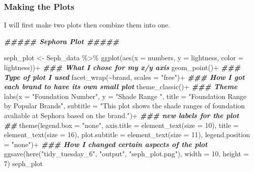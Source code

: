 \documentclass[
]{article}
\newenvironment{Shaded}{\begin{snugshade}}{\end{snugshade}}
\newcommand{\AttributeTok}[1]{\textcolor[rgb]{0.77,0.63,0.00}{#1}}
\newcommand{\DecValTok}[1]{\textcolor[rgb]{0.00,0.00,0.81}{#1}}
\newcommand{\DocumentationTok}[1]{\textcolor[rgb]{0.56,0.35,0.01}{\textbf{\textit{#1}}}}
\newcommand{\FunctionTok}[1]{\textcolor[rgb]{0.00,0.00,0.00}{#1}}
\newcommand{\NormalTok}[1]{#1}
\newcommand{\OtherTok}[1]{\textcolor[rgb]{0.56,0.35,0.01}{#1}}
\newcommand{\SpecialCharTok}[1]{\textcolor[rgb]{0.00,0.00,0.00}{#1}}
\newcommand{\StringTok}[1]{\textcolor[rgb]{0.31,0.60,0.02}{#1}}
\begin{document}
\hypertarget{making-the-plots}{%
\subsubsection{Making the Plots}\label{making-the-plots}}

I will first make two plots then combine them into one.

\begin{Shaded}
\begin{Highlighting}[]
\DocumentationTok{\#\#\#\#\# Sephora Plot \#\#\#\#\#}

\NormalTok{seph\_plot }\OtherTok{\textless{}{-}}\NormalTok{ Seph\_data }\SpecialCharTok{\%\textgreater{}\%}
  \FunctionTok{ggplot}\NormalTok{(}\FunctionTok{aes}\NormalTok{(}\AttributeTok{x =}\NormalTok{ numbers,             }
             \AttributeTok{y =}\NormalTok{ lightness,}
             \AttributeTok{color =}\NormalTok{ lightness))}\SpecialCharTok{+}               \DocumentationTok{\#\#\# What I chose for my x/y axis}
  \FunctionTok{geom\_point}\NormalTok{()}\SpecialCharTok{+}                                 \DocumentationTok{\#\#\# Type of plot I used}
  \FunctionTok{facet\_wrap}\NormalTok{(}\SpecialCharTok{\textasciitilde{}}\NormalTok{brand, }\AttributeTok{scales =} \StringTok{"free"}\NormalTok{)}\SpecialCharTok{+}          \DocumentationTok{\#\#\# How I got each brand to have its own small plot}
  \FunctionTok{theme\_classic}\NormalTok{()}\SpecialCharTok{+}                              \DocumentationTok{\#\#\# Theme }
  \FunctionTok{labs}\NormalTok{(}\AttributeTok{x =} \StringTok{"Foundation Number"}\NormalTok{,}
       \AttributeTok{y =} \StringTok{"Shade Range "}\NormalTok{,}
       \AttributeTok{title =} \StringTok{"Foundation Range by Popular Brands"}\NormalTok{,}
       \AttributeTok{subtitle =} \StringTok{"This plot shows the shade ranges }
\StringTok{of foundation avaliable at Sephora based on the brand."}\NormalTok{)}\SpecialCharTok{+} \DocumentationTok{\#\#\# new labels for the plot \#\#}
  \FunctionTok{theme}\NormalTok{(}\AttributeTok{legend.box =} \StringTok{"none"}\NormalTok{,}
        \AttributeTok{axis.title =} \FunctionTok{element\_text}\NormalTok{(}\AttributeTok{size =} \DecValTok{10}\NormalTok{),}
        \AttributeTok{title =} \FunctionTok{element\_text}\NormalTok{(}\AttributeTok{size =} \DecValTok{16}\NormalTok{),}
        \AttributeTok{plot.subtitle =} \FunctionTok{element\_text}\NormalTok{(}\AttributeTok{size =} \DecValTok{11}\NormalTok{),}
        \AttributeTok{legend.position =} \StringTok{"none"}\NormalTok{)}\SpecialCharTok{+}              \DocumentationTok{\#\#\# How I changed certain aspects of the plot}
 \FunctionTok{ggsave}\NormalTok{(}\FunctionTok{here}\NormalTok{(}\StringTok{"tidy\_tuesday\_6"}\NormalTok{, }\StringTok{"output"}\NormalTok{, }\StringTok{"seph\_plot.png"}\NormalTok{),}
       \AttributeTok{width =} \DecValTok{10}\NormalTok{, }\AttributeTok{height =} \DecValTok{7}\NormalTok{)}
\NormalTok{seph\_plot}
\end{Highlighting}
\end{Shaded}
\end{document}
